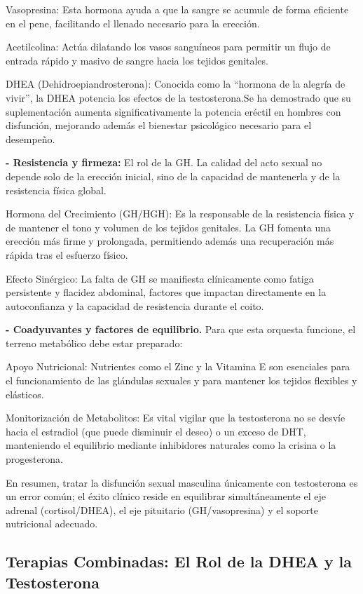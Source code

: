 \documentclass[
  spanish,
]{article}
\begin{document}
Vasopresina: Esta hormona ayuda a que la sangre se acumule de forma eficiente en el pene, facilitando el llenado necesario para la erección.

Acetilcolina: Actúa dilatando los vasos sanguíneos para permitir un flujo de entrada rápido y masivo de sangre hacia los tejidos genitales.

DHEA (Dehidroepiandrosterona): Conocida como la ``hormona de la alegría de vivir'', la DHEA potencia los efectos de la testosterona.Se ha demostrado que su suplementación aumenta significativamente la potencia eréctil en hombres con disfunción, mejorando además el bienestar psicológico necesario para el desempeño.

\textbf{- Resistencia y firmeza:} El rol de la GH.
La calidad del acto sexual no depende solo de la erección inicial, sino de la capacidad de mantenerla y de la resistencia física global.

Hormona del Crecimiento (GH/HGH): Es la responsable de la resistencia física y de mantener el tono y volumen de los tejidos genitales.
La GH fomenta una erección más firme y prolongada, permitiendo además una recuperación más rápida tras el esfuerzo físico.

Efecto Sinérgico: La falta de GH se manifiesta clínicamente como fatiga persistente y flacidez abdominal, factores que impactan directamente en la autoconfianza y la capacidad de resistencia durante el coito.

\textbf{- Coadyuvantes y factores de equilibrio.}
Para que esta orquesta funcione, el terreno metabólico debe estar preparado:

Apoyo Nutricional: Nutrientes como el Zinc y la Vitamina E son esenciales para el funcionamiento de las glándulas sexuales y para mantener los tejidos flexibles y elásticos.

Monitorización de Metabolitos: Es vital vigilar que la testosterona no se desvíe hacia el estradiol (que puede disminuir el deseo) o un exceso de DHT, manteniendo el equilibrio mediante inhibidores naturales como la crisina o la progesterona.

En resumen, tratar la disfunción sexual masculina únicamente con testosterona es un error común; el éxito clínico reside en equilibrar simultáneamente el eje adrenal (cortisol/DHEA), el eje pituitario (GH/vasopresina) y el soporte nutricional adecuado.

\subsection{Terapias Combinadas: El Rol de la DHEA y la Testosterona}\label{terapias-combinadas-el-rol-de-la-dhea-y-la-testosterona}
\end{document}
